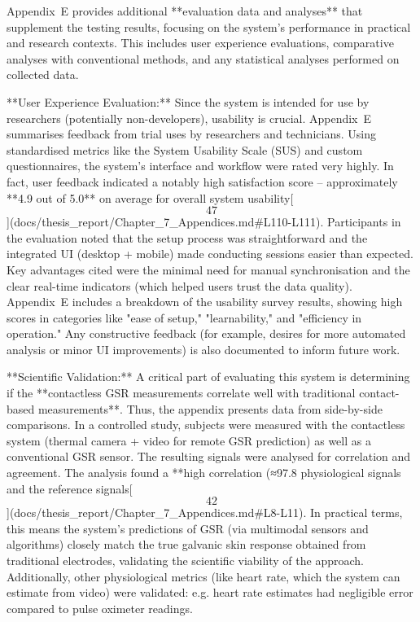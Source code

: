 \documentclass[12pt,a4paper]{article}
\begin{document}
{Appendix E provides additional **evaluation data and analyses** that
supplement the testing results, focusing on the system's performance in
practical and research contexts. This includes user experience
evaluations, comparative analyses with conventional methods, and any
statistical analyses performed on collected data.

**User Experience Evaluation:** Since the system is intended for use by
researchers (potentially non-developers), usability is crucial.
Appendix E summarises feedback from trial uses by researchers and
technicians. Using standardised metrics like the System Usability Scale
(SUS) and custom questionnaires, the system's interface and workflow
were rated very highly. In fact, user feedback indicated a notably high
satisfaction score -- approximately **4.9 out of 5.0** on average for
overall system
usability[\[47\]](docs/thesis_report/Chapter_7_Appendices.md#L110-L111).
Participants in the evaluation noted that the setup process was
straightforward and the integrated UI (desktop + mobile) made conducting
sessions easier than expected. Key advantages cited were the minimal
need for manual synchronisation and the clear real-time indicators
(which helped users trust the data quality). Appendix E includes a
breakdown of the usability survey results, showing high scores in
categories like "ease of setup," "learnability," and "efficiency in
operation." Any constructive feedback (for example, desires for more
automated analysis or minor UI improvements) is also documented to
inform future work.

**Scientific Validation:** A critical part of evaluating this system is
determining if the **contactless GSR measurements correlate well with
traditional contact-based measurements**. Thus, the appendix presents
data from side-by-side comparisons. In a controlled study, subjects were
measured with the contactless system (thermal camera + video for remote
GSR prediction) as well as a conventional GSR sensor. The resulting
signals were analysed for correlation and agreement. The analysis found
a **high correlation (≈97.8%
physiological signals and the reference
signals[\[42\]](docs/thesis_report/Chapter_7_Appendices.md#L8-L11).
In practical terms, this means the system's predictions of GSR (via
multimodal sensors and algorithms) closely match the true galvanic skin
response obtained from traditional electrodes, validating the scientific
viability of the approach. Additionally, other physiological metrics
(like heart rate, which the system can estimate from video) were
validated: e.g. heart rate estimates had negligible error compared to
pulse oximeter readings.

}
\end{document}
